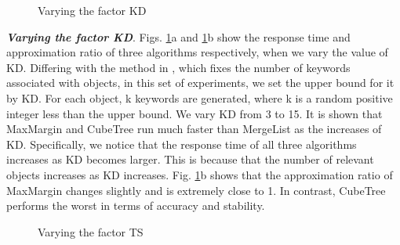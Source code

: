 \begin{figure}[h] \centering
\caption{Varying the factor KD}
\label{F7}
\end{figure}

\textbf{\textit{Varying the factor KD}}. Figs. \ref{F7}a and \ref{F7}b show the response time and approximation ratio of three algorithms respectively, when we vary the value of KD. Differing with the method in \cite{zhang2009keyword}, which fixes the number of keywords associated with objects, in this set of experiments, we set the upper bound for it by KD. For each object, k keywords are generated, where k is a random positive integer less than the upper bound. We vary KD from 3 to 15. It is shown that MaxMargin and CubeTree run much faster than MergeList as the increases of KD. Specifically, we notice that the response time of all three algorithms increases as KD becomes larger. This is because that the number of relevant objects increases as KD increases. Fig. \ref{F7}b shows that the approximation ratio of MaxMargin changes slightly and is extremely close to 1. In contrast, CubeTree performs the worst in terms of accuracy and stability.

\begin{figure}[h] \centering
\caption{Varying the factor TS}
\label{F8}
\end{figure}

